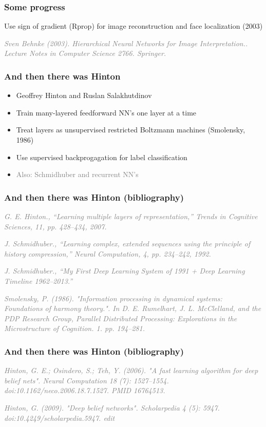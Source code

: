 \documentclass{beamer}
\newcommand\gray[1]{\textcolor{gray}{#1}}
\newcommand\smallgray[1]{\textcolor{gray}{\small\it #1}}
\newcommand\prevwork[1]{\smallgray{#1}}
\begin{document}
\begin{frame}
  \frametitle{Some progress}

  Use sign of gradient (Rprop) for image reconstruction and face
  localization (2003)

  \bigskip
  \prevwork{Sven Behnke (2003). Hierarchical Neural Networks for Image
    Interpretation.. Lecture Notes in Computer Science
    2766. Springer.}
\end{frame}

\begin{frame}
  \frametitle{And then there was Hinton}
  \begin{itemize}
  \item Geoffrey Hinton and Ruslan Salakhutdinov
  \item Train many-layered feedforward NN's one layer at a time
  \item Treat layers as unsupervised restricted Boltzmann machines
    (Smolensky, 1986)
  \item Use supervised backprogagation for label classification
  \item \gray{Also: Schmidhuber and recurrent NN's}
  \end{itemize}
\end{frame}

\begin{frame}
  \frametitle{And then there was Hinton (bibliography)}

\prevwork{G. E. Hinton., ``Learning multiple layers of
  representation,'' Trends in Cognitive Sciences, 11, pp. 428–434,
  2007.}

\medskip
\prevwork{J. Schmidhuber., ``Learning complex, extended sequences using
  the principle of history compression,'' Neural Computation, 4,
  pp. 234–242, 1992.}

\medskip
\prevwork{J. Schmidhuber., ``My First Deep Learning System of 1991 +
  Deep Learning Timeline 1962–2013.''}

\medskip
\prevwork{Smolensky, P. (1986). "Information processing in dynamical
  systems: Foundations of harmony theory.". In D. E. Rumelhart,
  J. L. McClelland, and the PDP Research Group, Parallel Distributed
  Processing: Explorations in the Microstructure of
  Cognition. 1. pp. 194–281.}
\end{frame}

\begin{frame}
  \frametitle{And then there was Hinton (bibliography)}

\prevwork{Hinton, G. E.; Osindero, S.; Teh, Y. (2006). "A fast
  learning algorithm for deep belief nets". Neural Computation 18 (7):
  1527–1554. doi:10.1162/neco.2006.18.7.1527. PMID 16764513.}

\medskip
\prevwork{Hinton, G. (2009). "Deep belief networks". Scholarpedia 4
  (5): 5947. doi:10.4249/scholarpedia.5947. edit}
\end{frame}
\end{document}
